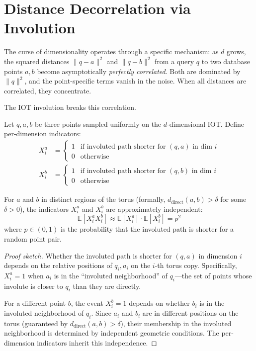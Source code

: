 \section{Distance Decorrelation via Involution}
\label{sec:involution}

The curse of dimensionality operates through a specific mechanism: as $d$ grows, the squared distances $\|q - a\|^2$ and $\|q - b\|^2$ from a query $q$ to two database points $a, b$ become asymptotically \emph{perfectly correlated}. Both are dominated by $\|q\|^2$, and the point-specific terms vanish in the noise. When all distances are correlated, they concentrate.

The IOT involution breaks this correlation.

\begin{theorem}
\label{thm:decorrelation}
Let $q, a, b$ be three points sampled uniformly on the $d$-dimensional IOT. Define per-dimension indicators:
\begin{align}
    X_i^a &= \begin{cases} 1 & \text{if involuted path shorter for $(q, a)$ in dim $i$} \\ 0 & \text{otherwise} \end{cases} \\
    X_i^b &= \begin{cases} 1 & \text{if involuted path shorter for $(q, b)$ in dim $i$} \\ 0 & \text{otherwise} \end{cases}
\end{align}

For $a$ and $b$ in distinct regions of the torus (formally, $d_{\text{direct}}(a, b) > \delta$ for some $\delta > 0$), the indicators $X_i^a$ and $X_i^b$ are approximately independent:
\begin{equation}
    \mathbb{E}[X_i^a X_i^b] \approx \mathbb{E}[X_i^a] \cdot \mathbb{E}[X_i^b] = p^2
\end{equation}
where $p \in (0, 1)$ is the probability that the involuted path is shorter for a random point pair.
\end{theorem}

\begin{proof}[Proof sketch]
Whether the involuted path is shorter for $(q, a)$ in dimension $i$ depends on the relative positions of $q_i, a_i$ on the $i$-th torus copy. Specifically, $X_i^a = 1$ when $a_i$ is in the ``involuted neighborhood'' of $q_i$---the set of points whose involute is closer to $q_i$ than they are directly.

For a different point $b$, the event $X_i^b = 1$ depends on whether $b_i$ is in the involuted neighborhood of $q_i$. Since $a_i$ and $b_i$ are in different positions on the torus (guaranteed by $d_{\text{direct}}(a,b) > \delta$), their membership in the involuted neighborhood is determined by independent geometric conditions. The per-dimension indicators inherit this independence.
\end{proof}

